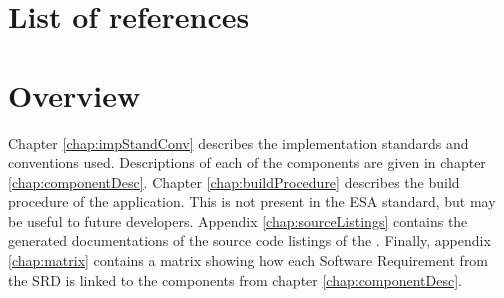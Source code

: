 \section{List of references}


\section{Overview}
Chapter \ref{chap:impStandConv} describes the implementation standards and conventions used. Descriptions of each of the components are given in chapter \ref{chap:componentDesc}. Chapter \ref{chap:buildProcedure} describes the build procedure of the application. This is not present in the ESA standard, but may be useful to future developers. Appendix \ref{chap:sourceListings} contains the generated documentations of the source code listings of the \applicationname{}. Finally, appendix \ref{chap:matrix} contains a matrix showing how each Software Requirement from the SRD \cite{srd} is linked to the components from chapter \ref{chap:componentDesc}.
